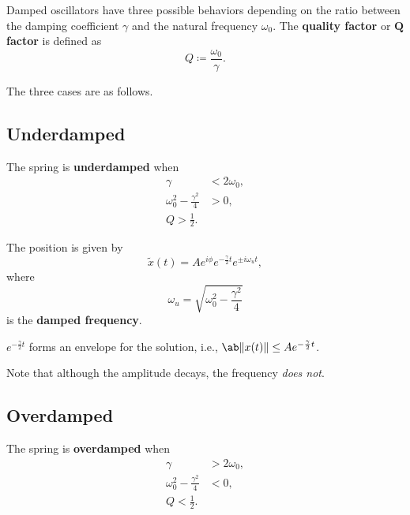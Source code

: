 Damped oscillators have three possible behaviors
depending on the ratio between the damping coefficient \(\gamma\) and
the natural frequency \(\omega_0\).
The \textbf{quality factor} or \textbf{\(\boldsymbol{Q}\) factor} is defined as
\begin{equation}
    Q \coloneq \frac{\omega_0}{\gamma}.
\end{equation}

The three cases are as follows.

\subsection{Underdamped}

The spring is \textbf{underdamped} when
\begin{equation}
    \begin{aligned}
        \gamma                          &< 2 \omega_0, \\
        \omega_0^2 - \frac{\gamma^2}{4} &> 0, \\
        Q > \frac{1}{2}.
    \end{aligned}
\end{equation}

The position is given by
\begin{equation}
    \tilde{x}(t) = A e^{i \phi} e^{- \frac{\gamma}{2} t} e^{\pm i \omega_u t},
\end{equation}
where
\begin{equation}
    \omega_u = \sqrt{\omega_0^2 - \frac{\gamma^2}{4}}
\end{equation}
is the \textbf{damped frequency}.

\(e^{- \frac{\gamma}{2} t}\) forms an envelope for the solution,
i.e., \(\ab\|x(t)\|\le A e^{- \frac{\gamma}{2} t}\).

Note that although the amplitude decays, the frequency \emph{does not}.

\subsection{Overdamped}

The spring is \textbf{overdamped} when
\begin{equation}
    \begin{aligned}
        \gamma                          &> 2 \omega_0, \\
        \omega_0^2 - \frac{\gamma^2}{4} &< 0, \\
        Q < \frac{1}{2}.
    \end{aligned}
\end{equation}

